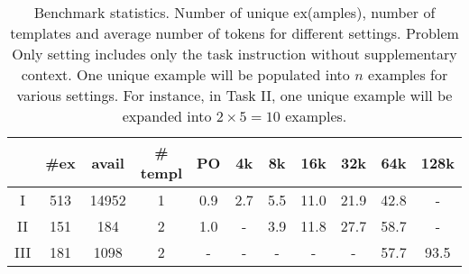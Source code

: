 
\begin{table}[t]
\centering
\small
\setlength{\tabcolsep}{3pt}
\begin{tabular}{@{}ccccccccccc@{}}
\toprule
    & \#ex & avail & \# templ & PO & 4k  & 8k  & 16k  & 32k  & 64k  & 128k \\ \midrule
I   & 513 & 14952 & 1        & 0.9      & 2.7 & 5.5 & 11.0 & 21.9 & 42.8 & - \\
II & 151 & 184  & 2        & 1.0      & - & 3.9 & 11.8 & 27.7 & 58.7 & -  \\
III & 181 & 1098 & 2        & - & - & - & -  & -  & 57.7 & 93.5 \\ \bottomrule
\end{tabular}
\caption{Benchmark statistics. Number of unique ex(amples), number of templates and average number of tokens for different settings. Problem Only setting includes only the task instruction without supplementary context. One unique example will be populated into $n$ examples for various settings. For instance, in Task II, one unique example will be expanded into $2 \times 5=10$ examples.}
\label{tb:stat}
\end{table}